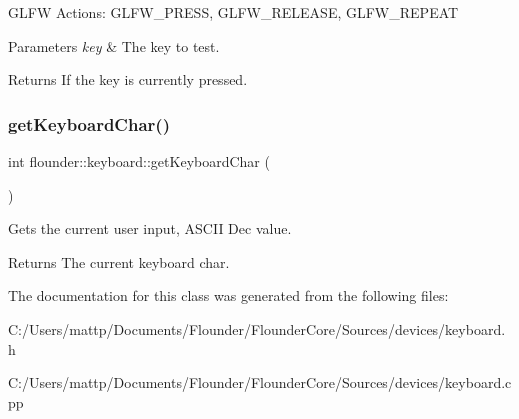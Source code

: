 G\+L\+FW Actions\+: G\+L\+F\+W\+\_\+\+P\+R\+E\+SS, G\+L\+F\+W\+\_\+\+R\+E\+L\+E\+A\+SE, G\+L\+F\+W\+\_\+\+R\+E\+P\+E\+AT


\begin{DoxyParams}{Parameters}
{\em key} & The key to test. \\
\hline
\end{DoxyParams}
\begin{DoxyReturn}{Returns}
If the key is currently pressed. 
\end{DoxyReturn}
\mbox{\label{classflounder_1_1keyboard_ad941be3ae52b1c60437695d8faf1b6d7}} 
\subsubsection{\texorpdfstring{get\+Keyboard\+Char()}{getKeyboardChar()}}
{\footnotesize\ttfamily int flounder\+::keyboard\+::get\+Keyboard\+Char (\begin{DoxyParamCaption}{ }\end{DoxyParamCaption})}



Gets the current user input, A\+S\+C\+II Dec value. 

\begin{DoxyReturn}{Returns}
The current keyboard char. 
\end{DoxyReturn}


The documentation for this class was generated from the following files\+:\begin{DoxyCompactItemize}
\item 
C\+:/\+Users/mattp/\+Documents/\+Flounder/\+Flounder\+Core/\+Sources/devices/keyboard.\+h\item 
C\+:/\+Users/mattp/\+Documents/\+Flounder/\+Flounder\+Core/\+Sources/devices/keyboard.\+cpp\end{DoxyCompactItemize}
